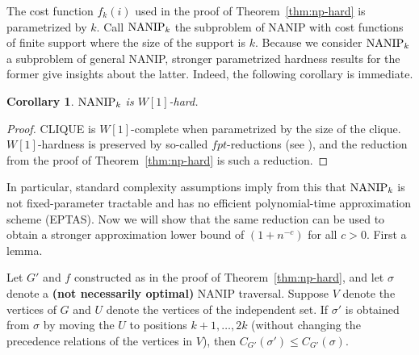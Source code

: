\documentclass[english]{llncs}
\newtheorem{cor}[thm]{Corollary}
\newcommand{\chg}[1]{\textbf{\color{red} #1}}
\begin{document}
The cost function $f_k(i)$ used in the proof of Theorem~\ref{thm:np-hard} is
parametrized by $k$.  Call $\textup{NANIP}_k$ the subproblem of NANIP with cost
functions of finite support where the size of the support is $k$. Because we
consider $\textup{NANIP}_k$ a subproblem of general NANIP, stronger
parametrized hardness results for the former give insights about the latter.
Indeed, the following corollary is immediate.

\begin{cor}
$\textup{NANIP}_k$ is $W[1]$-hard.
\end{cor}

\begin{proof} 

CLIQUE is $W[1]$-complete when parametrized by the size of the clique.
$W[1]$-hardness is preserved by so-called $fpt$-reductions (see
\cite{DowneyF13}), and the reduction from the proof of
Theorem~\ref{thm:np-hard} is such a reduction. 

\end{proof}

In particular, standard complexity assumptions imply from this that
$\textup{NANIP}_k$ is not fixed-parameter tractable and has no efficient
polynomial-time approximation scheme (EPTAS). Now we will show that the same
reduction can be used to obtain a stronger approximation lower bound of $(1 +
n^{-c})$ for all $c > 0$. First a lemma.

\begin{lemma}
Let $G'$ and $f$ constructed as in the proof of Theorem~\ref{thm:np-hard}, and let $\sigma$ denote a 
\chg{(not necessarily optimal)} NANIP traversal.
Suppose $V$ denote the vertices of $G$ and $U$ denote the vertices
of the independent set.  If $\sigma'$ is obtained from $\sigma$ by moving the
$U$ to positions $k+1,\ldots,2k$ (without changing the precedence relations of the vertices
in $V$), then $C_{G'}(\sigma')\le C_{G'}(\sigma)$.
\end{lemma}
\end{document}
